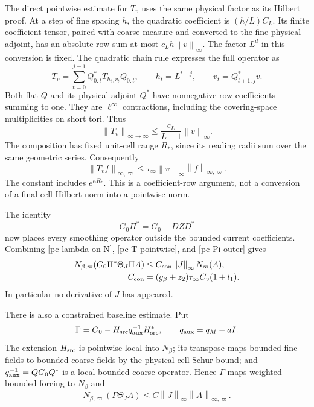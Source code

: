 \documentclass[11pt]{article}
\theoremstyle{remark}
\newcommand{\norm}[1]{\left\|#1\right\|}
\begin{document}
The direct pointwise estimate for $T_v$ uses the same physical
factor as its Hilbert proof. At a step of fine spacing $h$, the
quadratic coefficient is $(h/L)C_L$. Its finite coefficient tensor,
paired with coarse measure and converted to the fine physical
adjoint, has an absolute row sum at most $c_Lh\norm{v}_\infty$.
The factor $L^d$ in this conversion is fixed. The quadratic chain
rule expresses the full operator as
\begin{equation}\label{pc-pointwise-chain}
 T_v=\sum_{t=0}^{j-1}Q_{0:t}^*T_{h_t,v_t}Q_{0:t},\qquad
 h_t=L^{t-j},\qquad v_t=Q_{t+1:j}^*v.
\end{equation}
Both flat $Q$ and its physical adjoint $Q^*$ have nonnegative row
coefficients summing to one. They are $\ell^\infty$ contractions,
including the covering-space multiplicities on short tori. Thus
\[
 \norm{T_v}_{\infty\to\infty}
       \le\frac{c_L}{L-1}\norm{v}_\infty.
\]
The composition has fixed unit-cell range $R_*$, since its reading
radii sum over the same geometric series. Consequently
\begin{equation}\label{pc-T-pointwise}
 \norm{T_vf}_{\infty,\varpi}
       \le\tau_\infty\norm{v}_\infty
                         \norm{f}_{\infty,\varpi}.
\end{equation}
The constant includes $e^{\kappa R_*}$. This is a coefficient-row
argument, not a conversion of a final-cell Hilbert norm into a
pointwise norm.

The identity
\begin{equation}\label{pc-Pi-outer}
 G_0\Pi^*=G_0-DZD^*
\end{equation}
now places every smoothing operator outside the bounded current
coefficients. Combining \eqref{pc-lambda-on-N},
\eqref{pc-T-pointwise}, and \eqref{pc-Pi-outer} gives
\begin{align}
 N_{\beta,\varpi}(G_0\Pi^*\Theta_J\Pi A)
       &\le C_{\rm con}\norm{J}_\infty N_\varpi(A),
       \label{pc-constraint-N-bound}\\
 C_{\rm con}&=(g_\beta+z_2)\tau_\infty C_v(1+l_1).
       \notag
\end{align}
In particular no derivative of $J$ has appeared.

There is also a constrained baseline estimate. Put
\begin{equation}\label{pc-constrained-baseline}
 \Gamma=G_0-H_{\rm src}q_{\rm aux}^{-1}H_{\rm src}^*,
 \qquad q_{\rm aux}=q_M+aI.
\end{equation}
The extension $H_{\rm src}$ is pointwise local into $N_\beta$;
its transpose maps bounded fine fields to bounded coarse fields
by the physical-cell Schur bound; and
$q_{\rm aux}^{-1}=QG_0Q^*$ is a local bounded coarse operator.
Hence $\Gamma$ maps weighted bounded forcing to $N_\beta$ and
\begin{equation}\label{pc-constrained-current}
 N_{\beta,\varpi}(\Gamma\Theta_JA)
      \le C\norm{J}_\infty\norm{A}_{\infty,\varpi}.
\end{equation}
\end{document}
